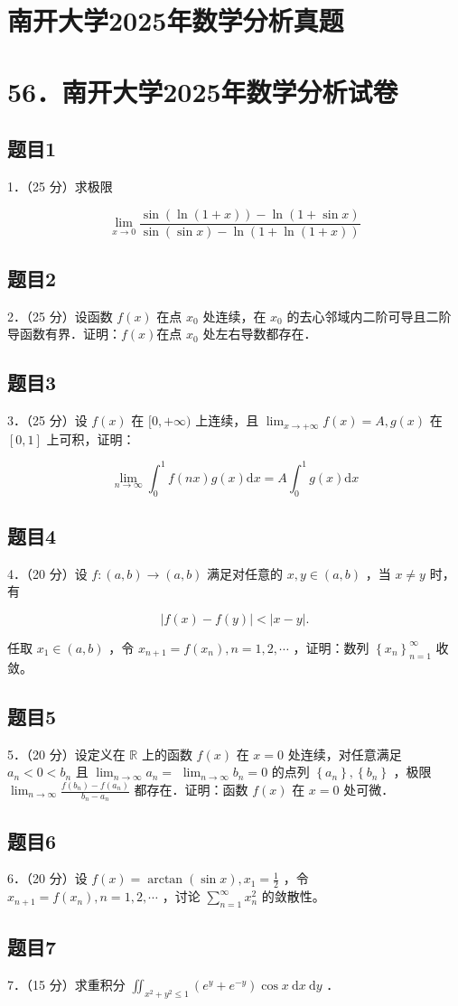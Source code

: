\documentclass{article}
\begin{document}
\section*{南开大学2025年数学分析真题}
\section*{56．南开大学2025年数学分析试卷}

\subsection{题目1}
1．（25 分）求极限

\[
\lim _{x \rightarrow 0} \frac{\sin (\ln (1+x))-\ln (1+\sin x)}{\sin (\sin x)-\ln (1+\ln (1+x))}
\]

\subsection{题目2}
2．（25 分）设函数 \(f(x)\) 在点 \(x_{0}\) 处连续，在 \(x_{0}\) 的去心邻域内二阶可导且二阶导函数有界．证明：\(f(x)\)在点 \(x_{0}\) 处左右导数都存在．

\subsection{题目3}
3．（25 分）设 \(f(x)\) 在 \([0,+\infty)\) 上连续，且 \(\lim _{x \rightarrow+\infty} f(x)=A, g(x)\) 在 \([0,1]\) 上可积，证明：

\[
\lim _{n \rightarrow \infty} \int_{0}^{1} f(n x) g(x) \mathrm{d} x=A \int_{0}^{1} g(x) \mathrm{d} x
\]

\subsection{题目4}
4．（20 分）设 \(f:(a, b) \rightarrow(a, b)\) 满足对任意的 \(x, y \in(a, b)\) ，当 \(x \neq y\) 时，有

\[
|f(x)-f(y)|<|x-y| .
\]

任取 \(x_{1} \in(a, b)\) ，令 \(x_{n+1}=f\left(x_{n}\right), n=1,2, \cdots\) ，证明：数列 \(\left\{x_{n}\right\}_{n=1}^{\infty}\) 收敛。

\subsection{题目5}
5．（20 分）设定义在 \(\mathbb{R}\) 上的函数 \(f(x)\) 在 \(x=0\) 处连续，对任意满足 \(a_{n}<0<b_{n}\) 且 \(\lim _{n \rightarrow \infty} a_{n}=\) \(\lim _{n \rightarrow \infty} b_{n}=0\) 的点列 \(\left\{a_{n}\right\},\left\{b_{n}\right\}\) ，极限 \(\lim _{n \rightarrow \infty} \frac{f\left(b_{n}\right)-f\left(a_{n}\right)}{b_{n}-a_{n}}\) 都存在．证明：函数 \(f(x)\) 在 \(x=0\) 处可微．

\subsection{题目6}
6．（20 分）设 \(f(x)=\arctan (\sin x), x_{1}=\frac{1}{2}\) ，令 \(x_{n+1}=f\left(x_{n}\right), n=1,2, \cdots\) ，讨论 \(\sum_{n=1}^{\infty} x_{n}^{2}\) 的敛散性。

\subsection{题目7}
7．（15 分）求重积分 \(\iint_{x^{2}+y^{2} \leq 1}\left(e^{y}+e^{-y}\right) \cos x \mathrm{~d} x \mathrm{~d} y\) ．
\end{document}

